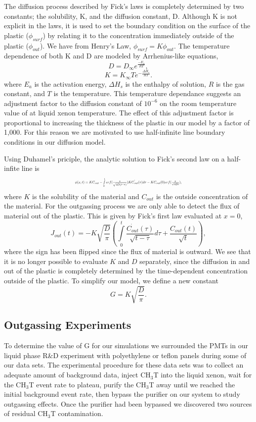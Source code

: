 The diffusion process described by Fick's laws is completely determined by two constants; the solubility, K, and the diffusion constant, D. Although K is not explicit in the laws, it is used to set the boundary condition on the surface of the plastic ($\phi _{surf}$) by relating it to the concentration immediately outside of the plastic ($\phi _{out}$). We have from Henry's Law, $\phi _{surf} = K\phi _{out}$. The temperature dependence of both K and D are modeled by Arrhenius-like equations,
\[D=D_{\infty}e^{\frac{-E_a}{RT}},\]
\[K=K_{\infty}Te^{-\frac{\Delta H_{s}}{RT}}.\]
where $E_a$ is the activation energy, $\Delta H_{s}$ is the enthalpy of solution, $R$ is the gas constant, and $T$ is the temperature.  This temperature dependance suggests an adjustment factor to the diffusion constant of $10^{-6}$ on the room temperature value of at liquid xenon temperature. \cite{Miyake,Flanconneche}  The effect of this adjustment factor is proportional to increasing the thickness of the plastic in our model by a factor of 1,000.  For this reason we are motivated to use half-infinite line boundary conditions in our diffusion model.

\newcommand*{\Scale}[2][4]{\scalebox{#1}{$#2$}}%

Using Duhamel's priciple, the analytic solution to Fick's second law on a half-infite line is
\[\Scale[0.5]{\phi (x,t) = KC_{out} - \int \limits_0^t erf(\frac{x}{\sqrt{4D(t - \tau)}})K\dot{C_{out}}(\tau)d\tau - KC_{out}(0)erf(\frac{x}{\sqrt{4Dt}}),}\]
where $K$ is the solubility of the material and $C_{out}$ is the outside concentration of the material. \cite{Piche} For the outgassing process we are only able to detect the flux of material out of the plastic.  This is given by Fick's first law evaluated at $x=0$,
\[J_{out}(t)= - K \sqrt{\frac{D}{\pi}}( \int \limits_0^t \frac{\dot{C_{out}}(\tau)}{\sqrt{t-\tau}} d \tau + \frac{C_{out}(t)}{\sqrt{t}}),\]
where the sign has been flipped since the flux of material is outward.  We see that it is no longer possible to evaluate $K$ and $D$ separately, since the diffusion in and out of the plastic is completely determined by the time-dependent concentration outside of the plastic.  To simplify our model, we define a new constant
\[ G = K \sqrt{ \frac{D}{ \pi }} .\]


\subsection{Outgassing Experiments}

To determine the value of G for our simulations we surrounded the PMTs in our liquid phase R\&D experiment with polyethylene or teflon panels during some of our data sets.  The experimental procedure for these data sets was to collect an adequate amount of background data, inject CH$_3$T into the liquid xenon, wait for the CH$_3$T event rate to plateau, purify the CH$_3$T away until we reached the initial background event rate, then bypass the purifier on our system to study outgassing effects.  Once the purifier had been bypassed we discovered two sources of residual CH$_3$T contamination.  

